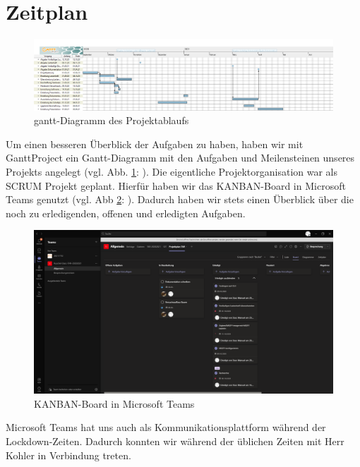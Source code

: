 \section{Zeitplan}\label{zeitplan}
\begin{figure}[H]
	\includegraphics[width=1\textwidth]{img/TAR_FKMS_20202021.png}
	\caption[gantt-Diagramm des Projektablaufs]{gantt-Diagramm des Projektablaufs}
 	\label{fig:gantt-diagramm}
\end{figure}
Um einen besseren Überblick der Aufgaben zu haben, haben wir mit GanttProject ein Gantt-Diagramm mit den Aufgaben und Meilensteinen unseres Projekts angelegt (vgl. Abb. \ref{fig:gantt-diagramm}: ).
Die eigentliche Projektorganisation war als SCRUM Projekt geplant. Hierfür haben wir das KANBAN-Board in Microsoft Teams genutzt (vgl. Abb \ref{fig:kanban}: ).
Dadurch haben wir stets einen Überblick über die noch zu erledigenden, offenen und erledigten Aufgaben.\\
\begin{figure}[H]
    \includegraphics[width=1\textwidth]{img/teams_kanban.png}
    \caption[KANBAN-Board in Microsoft Teams]{KANBAN-Board in Microsoft Teams}
    \label{fig:kanban}
\end{figure}
\noindent Microsoft Teams hat uns auch als Kommunikationsplattform während der Lockdown-Zeiten. 
Dadurch konnten wir während der üblichen Zeiten mit Herr Kohler in Verbindung treten.
\newpage